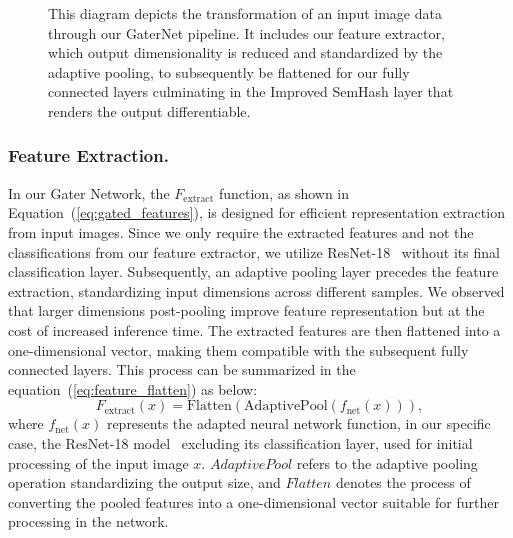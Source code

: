 \documentclass[runningheads]{llncs}
\begin{document}
\begin{figure}[htbp]
    \centering
    
    \caption{This diagram depicts the transformation of an input image data through our GaterNet pipeline. It includes our feature extractor, which output dimensionality is reduced and standardized by the adaptive pooling, to subsequently be flattened for our fully connected layers culminating in the Improved SemHash layer that renders the output differentiable.}
    \label{fig:feature_extractor}
    \end{figure}

\subsubsection{Feature Extraction.} In our Gater Network, the \( F_{\text{extract}} \) function, as shown in Equation~(\ref{eq:gated_features}), is designed for efficient representation extraction from input images. Since we only require the extracted features and not the classifications from our feature extractor, we utilize ResNet-18~\cite{he2016deep} without its final classification layer. Subsequently, an adaptive pooling layer precedes the feature extraction, standardizing input dimensions across different samples. We observed that larger dimensions post-pooling improve feature representation but at the cost of increased inference time. The extracted features are then flattened into a one-dimensional vector, making them compatible with the subsequent fully connected layers. This process can be summarized in the equation~(\ref{eq:feature_flatten}) as below:\begin{equation}
    F_{\text{extract}}(x) = \text{Flatten}(\text{AdaptivePool}(f_{\text{net}}(x))),
    \label{eq:feature_flatten}
\end{equation}where \( f_{\text{net}}(x) \) represents the adapted neural network function, in our specific case, the ResNet-18 model~\cite{he2016deep} excluding its classification layer, used for initial processing of the input image \( x \). $AdaptivePool$ refers to the adaptive pooling operation standardizing the output size, and $Flatten$ denotes the process of converting the pooled features into a one-dimensional vector suitable for further processing in the network.
\end{document}
